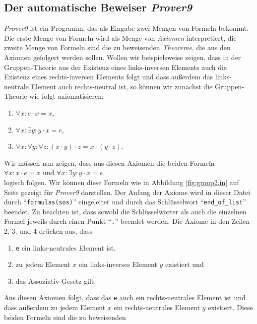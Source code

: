 \subsection{Der automatische Beweiser \textsl{Prover9}}
\textsl{Prover9} ist ein Programm, das als Eingabe zwei Mengen von Formeln bekommt.  Die erste Menge von
Formeln wird als Menge von \emph{Axiomen} interpretiert, die zweite Menge von Formeln sind die zu
beweisenden \emph{Theoreme}, die aus den Axiomen gefolgert werden sollen.  Wollen wir beispielsweise zeigen,
dass in der Gruppen-Theorie aus der Existenz eines  links-inversen Elements auch die Existenz eines
rechts-inversen Elements folgt und dass au\ss{}erdem das links-neutrale Element auch rechts-neutral ist,
so k\"{o}nnen wir zun\"{a}chst die Gruppen-Theorie wie folgt axiomatisieren:
\begin{enumerate}
\item $\forall x: e \cdot x = x$,
\item $\forall x: \exists y: y \cdot x = e$,
\item $\forall x: \forall y: \forall z: (x \cdot y) \cdot z = x \cdot (y \cdot z)$.
\end{enumerate}
Wir m\"{u}ssen nun zeigen, dass aus diesen Axiomen die beiden Formeln
\\[0.2cm]
\hspace*{1.3cm}
$\forall x: x \cdot e = x$ \quad und \quad $\forall x: \exists y: y \cdot x = e$ 
\\[0.2cm]
logisch folgen.  Wir k\"{o}nnen diese Formeln wie in Abbildung \ref{fig:group2.in} auf Seite
\pageref{fig:group2.in} gezeigt f\"{u}r \textsl{Prover9} darstellen.
Der Anfang der Axiome wird in dieser Datei durch ``\texttt{formulas(sos)}'' eingeleitet und durch
das Schl\"{u}sselwort ``\texttt{end\_of\_list}'' beendet.  Zu beachten ist, dass sowohl die Schl\"{u}sselw\"{o}rter als
auch die einzelnen Formel jeweils durch einen Punkt ``\texttt{.}'' beendet werden.  Die Axiome in den Zeilen
2, 3, und 4 dr\"{u}cken aus, dass 
\begin{enumerate}
\item \texttt{e} ein links-neutrales Element ist,
\item zu jedem Element $x$ ein links-inverses Element $y$ existiert und
\item das Assoziativ-Gesetz gilt.
\end{enumerate}
Aus diesen Axiomen folgt, dass das \texttt{e} auch ein rechts-neutrales Element ist und dass au\ss{}erdem zu
jedem Element $x$ ein rechts-neutrales Element $y$ existiert.  Diese beiden  Formeln sind die zu beweisenden 
